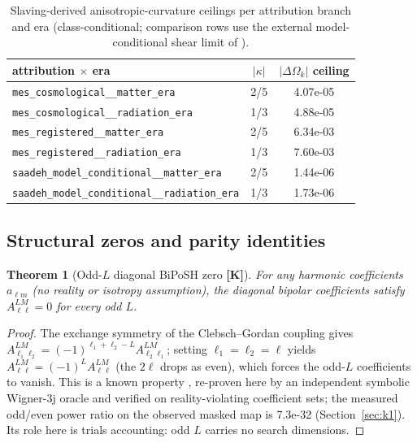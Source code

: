\documentclass[10pt]{article}
\newtheorem{theorem}{Theorem}[section]
\theoremstyle{definition}
\newcommand{\code}[1]{\texttt{\small #1}}
\newcommand{\tier}[1]{\textbf{[#1]}}
\newcommand{\dOk}{\Delta\Omega_{k}}
\begin{document}
\begin{table}[ht]
\centering\small
\begin{tabular}{lcc}
\toprule
attribution $\times$ era & $|\kappa|$ & $|\dOk|$ ceiling \\
\midrule
\code{mes\_cosmological\_\_matter\_era} & 2/5 & 4.07e-05 \\
\code{mes\_cosmological\_\_radiation\_era} & 1/3 & 4.88e-05 \\
\code{mes\_registered\_\_matter\_era} & 2/5 & 6.34e-03 \\
\code{mes\_registered\_\_radiation\_era} & 1/3 & 7.60e-03 \\
\code{saadeh\_model\_conditional\_\_matter\_era} & 2/5 & 1.44e-06 \\
\code{saadeh\_model\_conditional\_\_radiation\_era} & 1/3 & 1.73e-06 \\
\bottomrule
\end{tabular}
\caption{Slaving-derived anisotropic-curvature ceilings per
attribution branch and era (class-conditional; comparison rows use the
external model-conditional shear limit of \cite{Saadeh2016}).}
\label{tab:omk}
\end{table}

\subsection{Structural zeros and parity identities}

\begin{theorem}[Odd-$L$ diagonal BiPoSH zero \tier{K}]
\label{thm:oddl}
For any harmonic coefficients $a_{\ell m}$ (no reality or isotropy
assumption), the diagonal bipolar coefficients satisfy
$A^{LM}_{\ell\ell} = 0$ for every odd $L$.
\end{theorem}
\begin{proof}
The exchange symmetry of the Clebsch--Gordan coupling gives
$A^{LM}_{\ell_1\ell_2} = (-1)^{\ell_1+\ell_2-L}
A^{LM}_{\ell_2\ell_1}$; setting $\ell_1 = \ell_2 = \ell$ yields
$A^{LM}_{\ell\ell} = (-1)^{L} A^{LM}_{\ell\ell}$ (the $2\ell$ drops as
even), which forces the odd-$L$ coefficients to vanish. This is a
known property \cite{BookKamionkowskiSouradeep2012}, re-proven here by
an independent symbolic Wigner-3j oracle and verified on
reality-violating coefficient sets; the measured odd/even power ratio
on the observed masked map is 7.3e-32
(Section~\ref{sec:k1}). Its role here is trials accounting: odd $L$
carries no search dimensions.
\end{proof}
\end{document}

